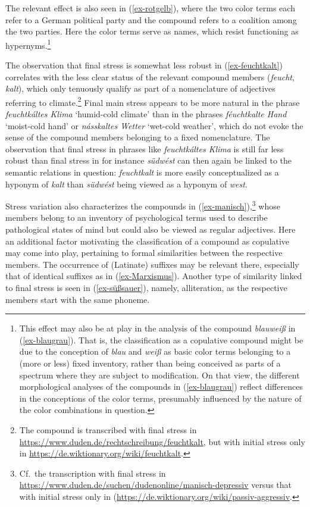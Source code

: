 \documentclass[output=paper
 ,nobabel
 ,draftmode
 ,colorlinks, citecolor=brown
]{langscibook}
\begin{document}
\largerpage
The relevant effect is also seen in (\ref{ex-rotgelb}), where the two color terms each refer to a German political party and the compound refers to a coalition among the two parties. Here the color terms serve as names, which resist functioning as hypernyms.\footnote{This effect may also be at play in the analysis of the compound \emph{blauweiß} in (\ref{ex-blaugrau}). That is, the classification as a copulative compound might be due to the conception of \emph{blau} and \emph{weiß} as basic color terms belonging to a (more or less) fixed inventory, rather than being conceived as parts of a spectrum where they are subject to modification. On that view, the different morphological analyses of the compounds in (\ref{ex-blaugrau}) reflect differences in the conceptions of the color terms, presumably influenced by the nature of the color combinations in question.} 

The observation that final stress is somewhat less robust in (\ref{ex-feuchtkalt}) correlates with the less clear status of the relevant compound members (\eg \emph{feucht}, \emph{kalt}), which only tenuously qualify as part of a nomenclature of adjectives referring to climate.\footnote {The compound is transcribed with final stress in \url{https://www.duden.de/rechtschreibung/feuchtkalt}, but with initial stress only in \url{https://de.wiktionary.org/wiki/feuchtkalt}.} Final main stress appears to be more natural in the phrase \emph{feuchtkáltes Klima} `humid-cold climate' than in the phrases \emph{féuchtkalte Hand} `moist-cold hand' or \emph{násskaltes Wetter} `wet-cold weather', which do not evoke the sense of the compound members belonging to a fixed nomenclature. The observation that final stress in phrases like \emph{feuchtkáltes Klima} is still far less robust than final stress in for instance \emph{südwést} can then again be linked to the semantic relations in question: \emph{feuchtkalt} is more easily conceptualized as a hyponym of \emph{kalt} than \emph{südwést} being viewed as a hyponym of \emph{west}. 

Stress variation also characterizes the compounds in (\ref{ex-manisch}),\footnote{Cf.\ the transcription with final stress in \url{https://www.duden.de/suchen/dudenonline/manisch-depressiv} versus that with initial stress only in (\url{https://de.wiktionary.org/wiki/passiv-aggressiv}.} whose members belong to an inventory of psychological terms used to describe pathological states of mind but could also be viewed as regular adjectives. Here an additional factor motivating the classification of a compound as copulative may come into play, pertaining to formal similarities between the respective members. The occurrence of (Latinate) suffixes may be relevant there, especially that of identical suffixes as in (\ref{ex-Marxismus}). Another type of similarity linked to final stress is seen in (\ref{ex-süßsauer}), namely, alliteration, as the respective members start with the same phoneme. 
\end{document}
